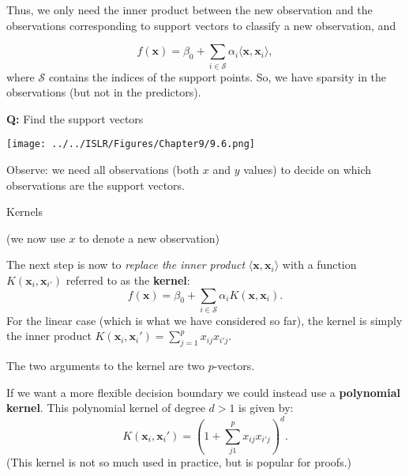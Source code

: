 \documentclass[10pt,ignorenonframetext,]{beamer}
\begin{document}
\begin{frame}

Thus, we only need the inner product between the new observation and the
observations corresponding to support vectors to classify a new
observation, and

\[
f({\boldsymbol x})=\beta_0 + \sum_{i \in \mathcal{S}} \alpha_i \langle {\boldsymbol x}, {\boldsymbol x}_i\rangle,
\] where \(\mathcal{S}\) contains the indices of the support points. So,
we have sparsity in the observations (but not in the predictors).

\end{frame}

\begin{frame}

\textbf{Q:} Find the support vectors

\texttt{[image: ../../ISLR/Figures/Chapter9/9.6.png]}

Observe: we need all observations (both \(x\) and \(y\) values) to
decide on which observations are the support vectors.

\end{frame}

\begin{frame}

\begin{block}{Kernels}

(we now use \(x\) to denote a new observation)

The next step is now to \emph{replace the inner product}
\(\langle {\boldsymbol x}, {\boldsymbol x}_i\rangle\) with a function
\(K({\boldsymbol x}_i,{\boldsymbol x}_{i'})\) referred to as the
\textbf{kernel}: \[
f({\boldsymbol x})=\beta_0 + \sum_{i \in \mathcal{S}} \alpha_i K({\boldsymbol x},{\boldsymbol x}_i).
\] For the linear case (which is what we have considered so far), the
kernel is simply the inner product
\(K({\boldsymbol x}_i,{\boldsymbol x}_i')=\sum_{j=1}^p x_{ij}x_{i'j}\).

The two arguments to the kernel are two \(p\)-vectors.

If we want a more flexible decision boundary we could instead use a
\textbf{polynomial kernel}. This polynomial kernel of degree \(d>1\) is
given by: \[
K({\boldsymbol x}_i,{\boldsymbol x}_i')=(1+\sum_{j1}^p x_{ij} x_{i'j})^d.
\] (This kernel is not so much used in practice, but is popular for
proofs.)

\end{block}

\end{frame}
\end{document}
